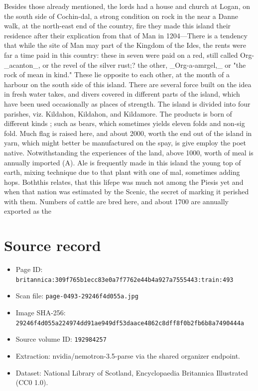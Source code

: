 \documentclass{article}
\begin{document}
Besides those already mentioned, the lords had a house and church at Logan, on the south side of Cochin-dal, a strong condition on rock in the near a Danne walk, at the north-east end of the country, fire they made this island their residence after their explication from that of Man in 1204—There is a tendency that while the site of Man may part of the Kingdom of the Ides, the rents were far a time paid in this country: these in seven were paid on a red, still called Org- \_acanton\_, or the revel of the silver rust;? the other, \_Org-a-amrgel,\_ or "the rock of mean in kind." These lie opposite to each other, at the month of a harbour on the south side of this island. There are several force built on the idea in fresh water takes, and divers covered in different parts of the island, which have been used occasionally as places of strength. The island is divided into four parishes, viz. Kildahon, Kildahon, and Kildamore. The products is born of different kinds ; such as bears, which sometimes yields eleven folds and non-sig fold. Much flag is raised here, and about 2000, worth the end out of the island in yarn, which might better be manufactured on the spay, is give employ the poet native. Notwithstanding the experiences of the land, above 1000, worth of meal is annually imported (A). Ale is frequently made in this island the young top of earth, mixing technique due to that plant with one of mal, sometimes adding hops. Boththis relates, that this lifepe was much not among the Piesis yet and when that nation was estimated by the Scenic, the secret of marking it perished with them. Numbers of cattle are bred here, and about 1700 are annually exported as the

\section*{Source record}
\begin{itemize}
\item Page ID: \texttt{britannica:309f765b1ecc83e0a7f7762e44b4a927a7555443:train:493}
\item Scan file: \texttt{page-0493-29246f4d055a.jpg}
\item Image SHA-256: \texttt{29246f4d055a224974dd91ae949df53daace4862c8dff8f0b2fb6b8a7490444a}
\item Source volume ID: \texttt{192984257}
\item Extraction: nvidia/nemotron-3.5-parse via the shared organizer endpoint.
\item Dataset: National Library of Scotland, Encyclopaedia Britannica Illustrated (CC0 1.0).
\end{itemize}
\end{document}
